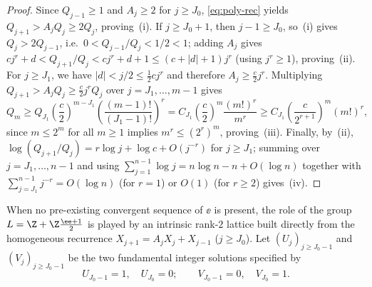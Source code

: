 \begin{proof}
Since $Q_{j-1}\ge1$ and $A_j\ge2$ for $j\ge J_0$, \eqref{eq:poly-rec} yields
$Q_{j+1}>A_jQ_j\ge2Q_j$, proving~(i). If $j\ge J_0+1$, then $j-1\ge J_0$, so~(i)
gives $Q_j>2Q_{j-1}$, i.e.\ $0<Q_{j-1}/Q_j<1/2<1$; adding $A_j$ gives
$cj^r+d<Q_{j+1}/Q_j<cj^r+d+1\le(c+|d|+1)j^r$ (using $j^r\ge1$), proving~(ii). For
$j\ge J_1$, we have $|d|<j/2\le\frac12 cj^r$ and therefore $A_j\ge\frac{c}{2}j^r$.
Multiplying $Q_{j+1}>A_jQ_j\ge\frac{c}{2}j^r Q_j$ over $j=J_1,\dots,m-1$ gives
\[
Q_m\ge Q_{J_1}\left(\frac{c}{2}\right)^{m-J_1}
\left(\frac{(m-1)!}{(J_1-1)!}\right)^r
=C_{J_1}\left(\frac{c}{2}\right)^m\frac{(m!)^r}{m^r}
\ge C_{J_1}\left(\frac{c}{2^{r+1}}\right)^m(m!)^r,
\]
since $m\le2^m$ for all $m\ge1$ implies $m^r\le(2^r)^m$, proving~(iii). Finally,
by~(ii), $\log(Q_{j+1}/Q_j)=r\log j+\log c+O(j^{-r})$ for $j\ge J_1$; summing
over $j=J_1,\dots,n-1$ and using $\sum_{j=1}^{n-1}\log j=n\log n-n+O(\log n)$
together with $\sum_{j=J_1}^{n-1}j^{-r}=O(\log n)$ (for $r=1$) or $O(1)$ (for
$r\ge2$) gives~(iv).
\end{proof}

When no pre-existing convergent sequence of $\ee$ is present, the role of the
group $L=\Z+\Z\frac{\ee+1}{2}$ is played by an intrinsic rank-$2$ lattice built
directly from the homogeneous recurrence $X_{j+1}=A_jX_j+X_{j-1}$ ($j\ge J_0$).
Let $(U_j)_{j\ge J_0-1}$ and $(V_j)_{j\ge J_0-1}$ be the two fundamental integer
solutions specified by
\[
U_{J_0-1}=1,\quad U_{J_0}=0;\qquad V_{J_0-1}=0,\quad V_{J_0}=1.
\]

